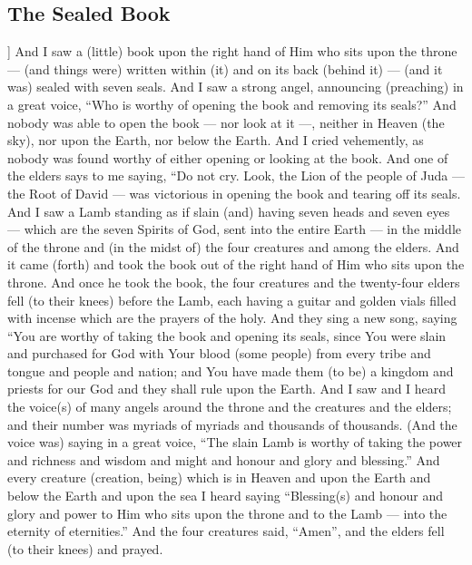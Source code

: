 \begin{pages}
\begin{Leftside}
        			\chapter{The Sealed Book}
				]
		And I saw a (little) book upon the right hand of Him who sits upon the throne — (and things were) written within (it) and on its back (behind it) — (and it was) sealed with seven seals. And I saw a strong angel, announcing (preaching) in a great voice, “Who is worthy of opening the book and removing its seals?” And nobody was able to open the book — nor look at it —, neither in Heaven (the sky), nor upon the Earth, nor below the Earth. And I cried vehemently, as nobody was found worthy of either opening or looking at the book.
		\pend
		\pstart
		And one of the elders says to me saying, “Do not cry. Look, the Lion of the people of Juda — the Root of David — was victorious in opening the book and tearing off its seals. And I saw a Lamb standing as if slain (and) having seven heads and seven eyes — which are the seven Spirits of God, sent into the entire Earth — in the middle of the throne and (in the midst of) the four creatures and among the elders. And it came (forth) and took the book out of the right hand of Him who sits upon the throne.
		\pend
		\pstart
		And once he took the book, the four creatures and the twenty-four elders fell (to their knees) before the Lamb, each having a guitar and golden vials filled with incense which are the prayers of the holy. And they sing a new song, saying “You are worthy of taking the book and opening its seals, since You were slain and purchased for God with Your blood (some people) from every tribe and tongue and people and nation; and You have made them (to be) a kingdom and priests for our God and they shall rule upon the Earth. 
		\pend
		\pstart
		And I saw and I heard the voice(s) of many angels around the throne and the creatures and the elders; and their number was myriads of myriads and thousands of thousands. (And the voice was) saying in a great voice, “The slain Lamb is worthy of taking the power and richness and wisdom and might and honour and glory and blessing.” And every creature (creation, being) which is in Heaven and upon the Earth and below the Earth and upon the sea I heard saying “Blessing(s) and honour and glory and power to Him who sits upon the throne and to the Lamb — into the eternity of eternities.” And the four creatures said, “Amen”, and the elders fell (to their knees) and prayed.
		\pend
        \endnumbering
    \end{Leftside}

\end{pages} 
\Pages